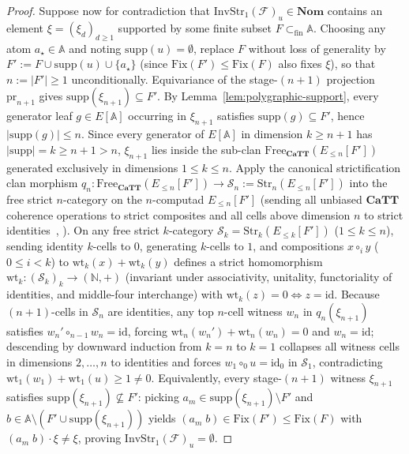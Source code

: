 \begin{proof}
Suppose now for contradiction that $\mathrm{InvStr}_1(\mathcal{F})_u \in \mathbf{Nom}$ contains an element $\xi = (\xi_d)_{d \ge 1}$ supported by some finite subset $F \subset_{\mathrm{fin}} \mathbb{A}$. Choosing any atom $a_\star \in \mathbb{A}$ and noting $\mathrm{supp}(u) = \emptyset$, replace $F$ without loss of generality by $F' := F \cup \mathrm{supp}(u) \cup \{a_\star\}$ (since $\mathrm{Fix}(F') \le \mathrm{Fix}(F)$ also fixes $\xi$), so that $n := |F'| \ge 1$ unconditionally. Equivariance of the stage-$(n+1)$ projection $\mathrm{pr}_{n+1}$ gives $\mathrm{supp}(\xi_{n+1}) \subseteq F'$. By Lemma~\ref{lem:polygraphic-support}, every generator leaf $g \in E[\mathbb{A}]$ occurring in $\xi_{n+1}$ satisfies $\mathrm{supp}(g) \subseteq F'$, hence $|\mathrm{supp}(g)| \le n$. Since every generator of $E[\mathbb{A}]$ in dimension $k \ge n + 1$ has $|\mathrm{supp}| = k \ge n + 1 > n$, $\xi_{n+1}$ lies inside the sub-clan $\mathrm{Free}_{\mathbf{CaTT}}(E_{\le n}[F'])$ generated exclusively in dimensions $1 \le k \le n$. Apply the canonical strictification clan morphism $q_n : \mathrm{Free}_{\mathbf{CaTT}}(E_{\le n}[F']) \to \mathcal{S}_n := \mathrm{Str}_n(E_{\le n}[F'])$ into the free strict $n$-category on the $n$-computad $E_{\le n}[F']$ (sending all unbiased $\mathbf{CaTT}$ coherence operations to strict composites and all cells above dimension $n$ to strict identities~\cite[\S 3]{FinsterMimram17}, \cite{BCM26}). On any free strict $k$-category $\mathcal{S}_k = \mathrm{Str}_k(E_{\le k}[F'])$ ($1 \le k \le n$), sending identity $k$-cells to $0$, generating $k$-cells to $1$, and compositions $x \circ_i y$ ($0 \le i < k$) to $\mathrm{wt}_k(x) + \mathrm{wt}_k(y)$ defines a strict homomorphism $\mathrm{wt}_k : (\mathcal{S}_k)_k \to (\mathbb{N}, +)$ (invariant under associativity, unitality, functoriality of identities, and middle-four interchange) with $\mathrm{wt}_k(z) = 0 \iff z = \mathrm{id}$. Because $(n+1)$-cells in $\mathcal{S}_n$ are identities, any top $n$-cell witness $w_n$ in $q_n(\xi_{n+1})$ satisfies $w_n' \circ_{n-1} w_n = \mathrm{id}$, forcing $\mathrm{wt}_n(w_n') + \mathrm{wt}_n(w_n) = 0$ and $w_n = \mathrm{id}$; descending by downward induction from $k = n$ to $k = 1$ collapses all witness cells in dimensions $2, \dots, n$ to identities and forces $w_1 \circ_0 u = \mathrm{id}_0$ in $\mathcal{S}_1$, contradicting $\mathrm{wt}_1(w_1) + \mathrm{wt}_1(u) \ge 1 \neq 0$. Equivalently, every stage-$(n+1)$ witness $\xi_{n+1}$ satisfies $\mathrm{supp}(\xi_{n+1}) \not\subseteq F'$: picking $a_m \in \mathrm{supp}(\xi_{n+1}) \setminus F'$ and $b \in \mathbb{A} \setminus (F' \cup \mathrm{supp}(\xi_{n+1}))$ yields $(a_m \; b) \in \mathrm{Fix}(F') \le \mathrm{Fix}(F)$ with $(a_m \; b) \cdot \xi \neq \xi$, proving $\mathrm{InvStr}_1(\mathcal{F})_u = \emptyset$.
\end{proof}

